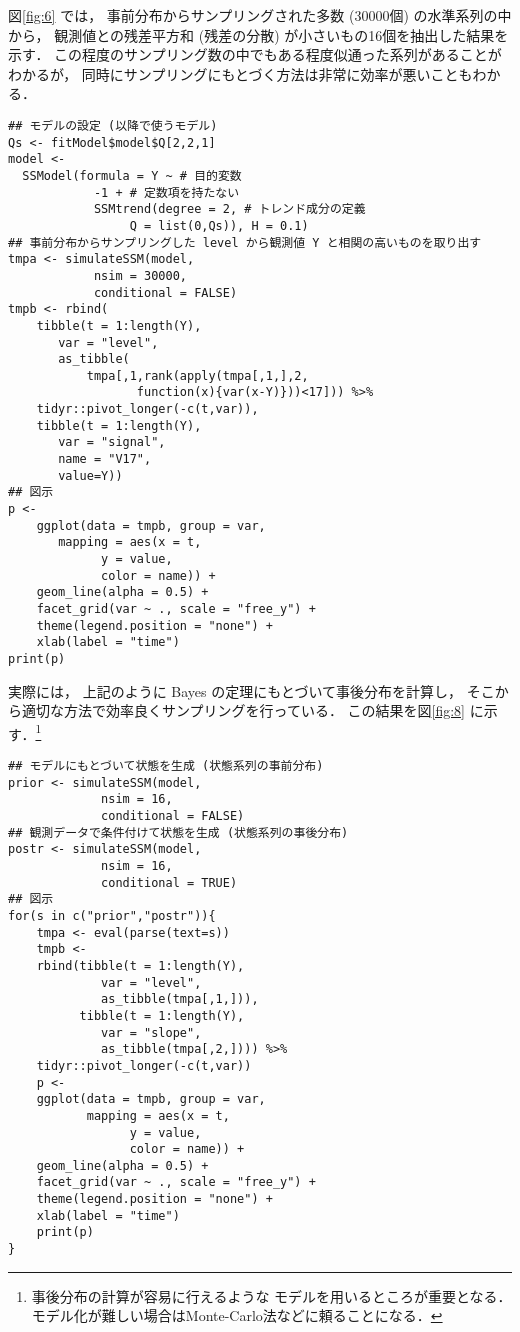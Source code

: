 \documentclass[10pt,oneside,fleqn]{scrartcl}
\begin{document}
図\ref{fig:6}
では，
事前分布からサンプリングされた多数 (30000個)
の水準系列の中から，
観測値との残差平方和 (残差の分散) が小さいもの16個を抽出した結果を示す．
この程度のサンプリング数の中でもある程度似通った系列があることがわかるが，
同時にサンプリングにもとづく方法は非常に効率が悪いこともわかる．

\begin{figure}[htbp]
  \centering
  \myGraph*{}
\end{figure}

\begin{verbatim}
## モデルの設定 (以降で使うモデル)
Qs <- fitModel$model$Q[2,2,1]
model <-
  SSModel(formula = Y ~ # 目的変数
		    -1 + # 定数項を持たない
		    SSMtrend(degree = 2, # トレンド成分の定義
			     Q = list(0,Qs)), H = 0.1)
## 事前分布からサンプリングした level から観測値 Y と相関の高いものを取り出す
tmpa <- simulateSSM(model,
		    nsim = 30000,
		    conditional = FALSE)
tmpb <- rbind(
    tibble(t = 1:length(Y),
	   var = "level",
	   as_tibble(
	       tmpa[,1,rank(apply(tmpa[,1,],2,
				  function(x){var(x-Y)}))<17])) %>%
    tidyr::pivot_longer(-c(t,var)),
    tibble(t = 1:length(Y),
	   var = "signal",
	   name = "V17",
	   value=Y))
## 図示
p <- 
    ggplot(data = tmpb, group = var,
	   mapping = aes(x = t,
			 y = value,
			 color = name)) +
    geom_line(alpha = 0.5) +
    facet_grid(var ~ ., scale = "free_y") +
    theme(legend.position = "none") +
    xlab(label = "time")
print(p)
\end{verbatim}

実際には，
上記のように Bayes の定理にもとづいて事後分布を計算し，
そこから適切な方法で効率良くサンプリングを行っている．
この結果を図\ref{fig:8}
に示す．\footnote{事後分布の計算が容易に行えるような
モデルを用いるところが重要となる．
モデル化が難しい場合はMonte-Carlo法などに頼ることになる．}

\begin{figure*}[htbp]
  \centering
\end{figure*}

\begin{verbatim}
## モデルにもとづいて状態を生成 (状態系列の事前分布)
prior <- simulateSSM(model,
		     nsim = 16,
		     conditional = FALSE)
## 観測データで条件付けて状態を生成 (状態系列の事後分布)
postr <- simulateSSM(model,
		     nsim = 16,
		     conditional = TRUE)
## 図示
for(s in c("prior","postr")){
    tmpa <- eval(parse(text=s))
    tmpb <- 
	rbind(tibble(t = 1:length(Y),
		     var = "level",
		     as_tibble(tmpa[,1,])),
	      tibble(t = 1:length(Y),
		     var = "slope",
		     as_tibble(tmpa[,2,]))) %>%
	tidyr::pivot_longer(-c(t,var)) 
    p <- 
	ggplot(data = tmpb, group = var,
	       mapping = aes(x = t,
			     y = value,
			     color = name)) +
	geom_line(alpha = 0.5) +
	facet_grid(var ~ ., scale = "free_y") +
	theme(legend.position = "none") +
	xlab(label = "time")
    print(p)
}
\end{verbatim}
\end{document}
